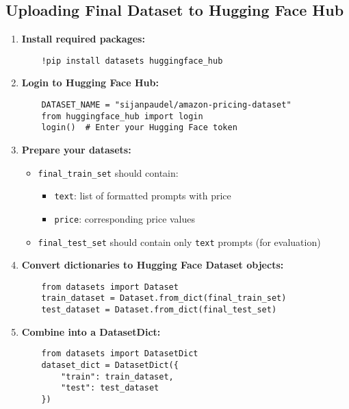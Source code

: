 \subsection{Uploading Final Dataset to Hugging Face Hub}
\begin{tcolorbox}[colback=green!5!white, colframe=green!75!black, title=Dataset Upload Guide]
\begin{enumerate}
    \item \textbf{Install required packages:}
    \begin{verbatim}
    !pip install datasets huggingface_hub
    \end{verbatim}

    \item \textbf{Login to Hugging Face Hub:}
    \begin{verbatim}
    DATASET_NAME = "sijanpaudel/amazon-pricing-dataset"
    from huggingface_hub import login
    login()  # Enter your Hugging Face token
    \end{verbatim}
    
    \item \textbf{Prepare your datasets:}
    \begin{itemize}
        \item \texttt{final\_train\_set} should contain:
        \begin{itemize}
            \item \texttt{text}: list of formatted prompts with price
            \item \texttt{price}: corresponding price values
        \end{itemize}
        \item \texttt{final\_test\_set} should contain only \texttt{text} prompts (for evaluation)
    \end{itemize}

    \item \textbf{Convert dictionaries to Hugging Face Dataset objects:}
    \begin{verbatim}
    from datasets import Dataset
    train_dataset = Dataset.from_dict(final_train_set)
    test_dataset = Dataset.from_dict(final_test_set)
    \end{verbatim}

    \item \textbf{Combine into a DatasetDict:}
    \begin{verbatim}
    from datasets import DatasetDict
    dataset_dict = DatasetDict({
        "train": train_dataset,
        "test": test_dataset
    })
    \end{verbatim}


\end{enumerate}
\end{tcolorbox}
